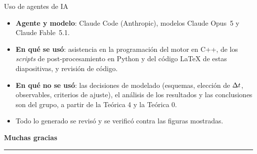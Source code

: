 \documentclass[aspectratio=169,11pt]{beamer}
\begin{document}
\begin{frame}{Uso de agentes de IA}
    \vfill
    \begin{center}
    \begin{minipage}{0.88\textwidth}
        \normalsize
        \begin{itemize}\setlength{\itemsep}{0.9em}
            \item \textbf{Agente y modelo}: Claude Code (Anthropic), modelos Claude
                  Opus~5 y Claude Fable~5.1.
            \item \textbf{En qué se usó}: asistencia en la programación del motor en
                  C++, de los \textit{scripts} de post-procesamiento en Python y del
                  código \LaTeX{} de estas diapositivas, y revisión de código.
            \item \textbf{En qué no se usó}: las decisiones de modelado (esquemas,
                  elección de $\Delta t$, observables, criterios de ajuste), el análisis de
                  los resultados y las conclusiones son del grupo, a partir de la
                  Teórica 4 y la Teórica 0.
            \item Todo lo generado se revisó y se verificó contra las figuras mostradas.
        \end{itemize}
    \end{minipage}
    \end{center}
    \vfill
\end{frame}

\begin{frame}
    \vfill
    \begin{center}
        {\Large\bfseries\color{azul} Muchas gracias}\\[0.6em]
        \textcolor{azul!30}{\rule{0.25\textwidth}{1pt}}
    \end{center}
    \vfill
\end{frame}
\end{document}
